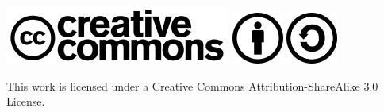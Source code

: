 \vspace{250pt}


\begin{center}
	\includegraphics[scale=0.5]{./pictures/280px-CreativeCommond_logo_trademark.png}
	\includegraphics[scale=0.5]{./pictures/64px-Cc-by_new.png}
	\includegraphics[scale=0.5]{./pictures/64px-Cc-sa_white.png}
\end{center}
\begin{center}This work is licensed under a Creative Commons Attribution-ShareAlike 3.0 License.\end{center}


